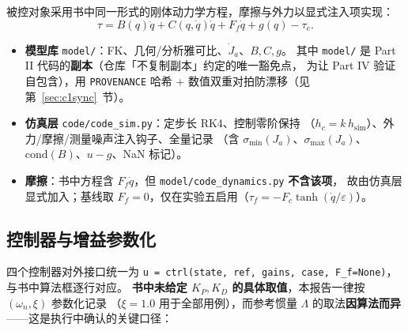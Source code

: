 \documentclass[11pt,a4paper]{ctexart}
\begin{document}
被控对象采用书中同一形式的刚体动力学方程，摩擦与外力以显式注入项实现：
\begin{equation}
\tau = B(q)\ddot q + C(q,\dot q)\dot q + F_f\dot q + g(q) - \tau_e .
\end{equation}

\begin{itemize}[leftmargin=1.6em,itemsep=2pt]
\item \textbf{模型库} \texttt{model/}：FK、几何/分析雅可比、$\dot J_a$、$B,C,g$。
  其中 \texttt{model/} 是 Part II 代码的\textbf{副本}（仓库「不复制副本」约定的唯一豁免点，
  为让 Part IV 验证自包含），用 \texttt{PROVENANCE} 哈希 + 数值双重对拍防漂移（见第~\ref{sec:c1sync}~节）。
\item \textbf{仿真层} \texttt{code/code\_sim.py}：定步长 RK4、控制零阶保持
  （$h_c=k\,h_{\mathrm{sim}}$）、外力/摩擦/测量噪声注入钩子、全量记录
  （含 $\sigma_{\min}(J_a)$、$\sigma_{\max}(J_a)$、$\mathrm{cond}(B)$、$u-g$、NaN 标记）。
\item \textbf{摩擦}：书中方程含 $F_f\dot q$，但 \texttt{model/code\_dynamics.py} \textbf{不含该项}，
  故由仿真层显式加入；基线取 $F_f=0$，仅在实验五启用（$\tau_f=-F_c\tanh(\dot q/\varepsilon)$）。
\end{itemize}

\subsection{控制器与增益参数化}

四个控制器对外接口统一为 \texttt{u = ctrl(state, ref, gains, case, F\_f=None)}，与书中算法框逐行对应。
\textbf{书中未给定 $K_P,K_D$ 的具体取值}，本报告一律按 $(\omega_n,\xi)$ 参数化记录
（$\xi=1.0$ 用于全部用例），而参考惯量 $\Lambda$ 的取法\textbf{因算法而异}——这是执行中确认的关键口径：

\begin{table}[H]
\centering
\small
{}
\end{table}
\end{document}
